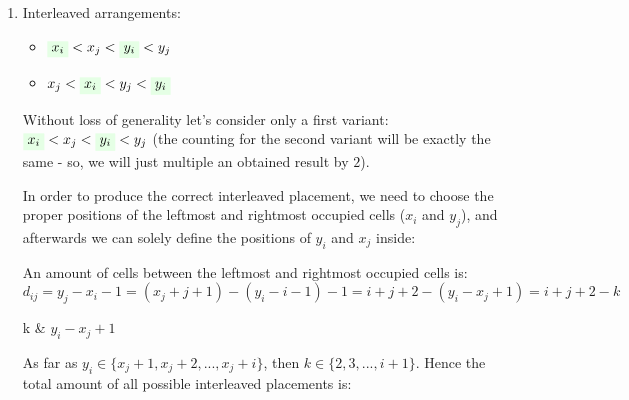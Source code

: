 \documentclass{article}
\makeatletter
\newcommand{\highlight}[1]{\colorbox{green!10}{$\displaystyle#1$}}
\newenvironment{conditions_eq}[1][where:]
  {#1 \begin{tabular}[t]{>{$}l<{$} @{${} = {}$} l}}
  {\end{tabular}\\[\belowdisplayskip]}
\makeatother
\begin{document}
\begin{enumerate}
\item Interleaved arrangements:

\begin{itemize}
\item $\highlight{x_i} < x_j < \highlight{y_i} < y_j$ 
\item $x_j < \highlight{x_i} < y_j < \highlight{y_i}$ 
\end{itemize}

Without loss of generality let's consider only a first variant: $\highlight{x_i} < x_j < \highlight{y_i} < y_j$ (the counting for the second variant will be exactly the same - so, we will just multiple an obtained result by $2$). 

In order to produce the correct interleaved placement, we need to choose the proper positions of the leftmost and rightmost occupied cells ($x_i$ and $y_j$), and afterwards we can solely define the positions of $y_i$ and $x_j$ inside:


An amount of cells between the leftmost and rightmost occupied cells is:
\begin{equation}
d_{ij} = y_j - x_i - 1 = (x_j + j + 1) - (y_i - i - 1) - 1 = i + j + 2 - (y_i - x_j + 1) = i + j + 2 - k
\end{equation}
\begin{conditions_eq}
k &  $y_i - x_j + 1$
\end{conditions_eq}
As far as $y_i \in \{x_j + 1, x_j + 2, ... , x_j + i\}$, then $k \in \{2, 3, ... , i + 1\}$.
Hence the total amount of all possible interleaved placements is:


\end{enumerate}
\end{document}

